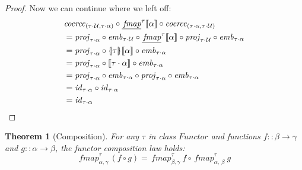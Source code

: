 \documentclass{sigplanconf}
\newcommand{\U}{\ensuremath{\mathcal{U}}}
\newcommand{\univ}[1]{\ensuremath{\underline{#1}}}
\newcommand{\REP}[1]{\ensuremath{\llbracket#1\rrbracket}}
\newcommand{\symlbrace}{\mathopen{\lbrace\mkern-4.5mu\mid}}
\newcommand{\symrbrace}{\mathclose{\mid\mkern-4.5mu\rbrace}}
\newcommand{\TC}[1]{\ensuremath{\symlbrace#1\symrbrace}}
\newcommand{\hair}{\mskip1mu}
\newcommand{\hsc}[1]{\ensuremath{\mathit{#1}}}
\newcommand{\hsid}{\hsc{id}}
\newcommand{\hscoerce}{\hsc{coerce}}
\newcommand{\fmap}{\,\hsc{fmap}} %
\newcommand{\fmapU}{\univ{\fmap}}
\newcommand{\tA}{\alpha}
\newcommand{\tB}{\beta}
\newcommand{\tC}{\gamma}
\newcommand{\tT}{\tau}
\newtheorem{theorem}{Theorem}
\theoremstyle{definition}
\begin{document}
\begin{proof}
\noindent
Now we can continue where we left off:
%
\begin{align*}
& \hscoerce_{(\tT\cdot\hair\U,\tT\cdot\tA)} \circ \fmapU^\tT \REP{\tA} \circ \hscoerce_{(\tT\cdot\tA,\tT\cdot\hair\U)} \\
& = \hsc{proj}_{\tT\cdot\tA} \circ \hsc{emb}_{\tT\cdot\hair\U} \circ \fmapU^\tT \REP{\tA} \circ \hsc{proj}_{\tT\cdot\hair\U} \circ \hsc{emb}_{\tT\cdot\tA} \\
&= \hsc{proj}_{\tT\cdot\tA} \circ \TC{\tT}\REP{\tA} \circ \hsc{emb}_{\tT\cdot\tA} \\
&= \hsc{proj}_{\tT\cdot\tA} \circ \REP{\tT\cdot\tA} \circ \hsc{emb}_{\tT\cdot\tA} \\
&= \hsc{proj}_{\tT\cdot\tA} \circ \hsc{emb}_{\tT\cdot\tA} \circ \hsc{proj}_{\tT\cdot\tA} \circ \hsc{emb}_{\tT\cdot\tA} \\
&= \hsid_{\tT\cdot\tA} \circ \hsid_{\tT\cdot\tA} \\
&= \hsid_{\tT\cdot\tA}\qedhere
\end{align*}
\end{proof}

\begin{theorem}[Composition]
\label{thm:functor-composition}
For any $\tT$ in class \hsc{Functor} and functions $f::\tB\to\tC$ and $g::\tA\to\tB$, the functor composition law holds:
\begin{equation*}
\fmap^\tT_{\tA,\tC}\,(f \circ g) = \fmap^\tT_{\tB,\tC}\:f \circ \fmap^\tT_{\tA,\,\tB}\:g
\end{equation*}
\end{theorem}
\end{document}
